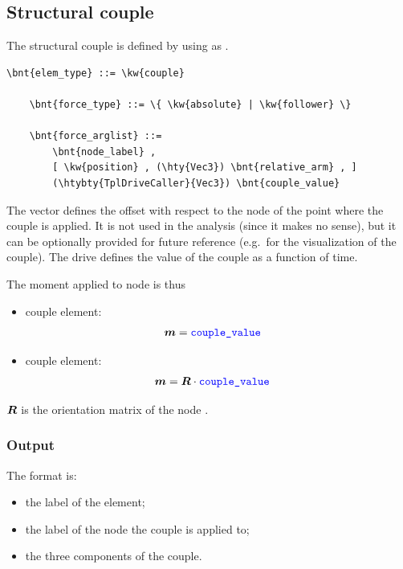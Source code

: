 \subsection{Structural couple}
\label{sec:EL:FORCE:STRUCTURAL:COUPLE}
The structural couple is defined by using  as .
\begin{Verbatim}[commandchars=\\\{\}]
    \bnt{elem_type} ::= \kw{couple}

    \bnt{force_type} ::= \{ \kw{absolute} | \kw{follower} \} 

    \bnt{force_arglist} ::=
        \bnt{node_label} ,
        [ \kw{position} , (\hty{Vec3}) \bnt{relative_arm} , ]
        (\htybty{TplDriveCaller}{Vec3}) \bnt{couple_value}
\end{Verbatim}
The vector  defines the offset with respect
to the node of the point where the couple is applied.
It is not used in the analysis (since it makes no sense),
but it can be optionally provided for future reference
(e.g.\ for the visualization of the couple).
The drive  defines the value of the couple
as a function of time.

The moment applied to node  is thus
\begin{itemize}
\item {} couple element:
\begin{align}
	\boldsymbol{m} & = \textcolor{blue}{\texttt{couple\_value}}
\end{align}

\item {} couple element:
\begin{align}
	\boldsymbol{m} & = \boldsymbol{R} \cdot \textcolor{blue}{\texttt{couple\_value}}
\end{align}
\end{itemize}
$\boldsymbol{R}$ is the orientation matrix of the node .

\subsubsection{Output}
The format is:
\begin{itemize}
    \item the label of the element;
    \item the label of the node the couple is applied to;
    \item the three components of the couple.
\end{itemize}

